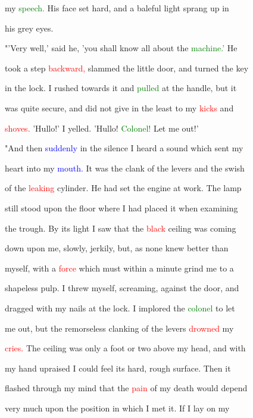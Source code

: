  my \textcolor{green}{speech.} His face set hard, and a baleful light sprang up in

 his grey eyes.



 "'Very well,' said he, 'you shall know all about the \textcolor{green}{machine.'} He

 took a step \textcolor{red}{backward,} \textcolor{BurntOrange}{slammed} the little door, and turned the key

 in the lock. I rushed towards it and \textcolor{green}{pulled} at the handle, but it

 was quite secure, and did not give in the least to my \textcolor{red}{kicks} and

 \textcolor{red}{shoves.} 'Hullo!' I \textcolor{BurntOrange}{yelled.} 'Hullo! \textcolor{green}{Colonel!} Let me out!'



 "And then \textcolor{blue}{suddenly} in the silence I heard a sound which sent my

 heart into my \textcolor{blue}{mouth.} It was the clank of the levers and the swish

 of the \textcolor{red}{leaking} cylinder. He had set the engine at work. The lamp

 still stood upon the floor where I had placed it when examining

 the trough. By its light I saw that the \textcolor{red}{black} ceiling was coming

 down upon me, slowly, jerkily, but, as none knew better than

 myself, with a \textcolor{red}{force} which must within a minute grind me to a

 shapeless pulp. I threw myself, \textcolor{BurntOrange}{screaming,} against the door, and

 dragged with my nails at the lock. I implored the \textcolor{green}{colonel} to let

 me out, but the remorseless clanking of the levers \textcolor{red}{drowned} my

 \textcolor{red}{cries.} The ceiling was only a foot or two above my head, and with

 my hand upraised I could feel its hard, rough surface. Then it

 flashed through my mind that the \textcolor{red}{pain} of my \textcolor{BurntOrange}{death} would \textcolor{BurntOrange}{depend}

 very much upon the position in which I met it. If I lay on my

